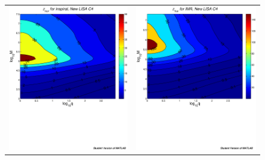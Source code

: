 \documentclass{iopart}
\begin{document}
\begin{figure}[H]
\begin{center}
\begin{tabular}{cc}
\includegraphics[scale=0.41,clip=true]{FigEmanuele/C4InspZhorContour.ps}
&\includegraphics[scale=0.41,clip=true]{FigEmanuele/C4IMRZhorContour.ps}\\

\end{tabular}
\end{center}
\end{figure}
\end{document}
